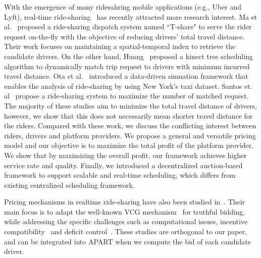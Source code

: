 With the emergence of many ridesahring mobile applications (e.g., Uber and Lyft), real-time ride-sharing~\cite{Ma13, Ma15, Huang14,Ota15, Cici15, Cao15, PelzerITS15} has recently attracted more research interest. Ma et al.~\cite{Ma13, Ma15} proposed a ride-sharing dispatch system named ``T-share" to serve the rider request on-the-fly with the objective of reducing drivers' total travel distance. Their work focuses on maintaining a spatial-temporal index to retrieve the candidate drivers. On the other hand, Huang~\cite{Huang14} proposed a kinect tree scheduling algorithm to dynamically match trip request to drivers with minimum incurred travel distance. Ota et al.~\cite{Ota15} introduced a data-driven simuation framework that enables the analysis of ride-sharing by using New York's taxi dataset. Santos et. al~\cite{SantosIjcai13} propose a ride-sharing system to maximize the number of matched request. The majority of these studies aim to minimize the total travel distance of drivers, however, we show that this does not necessarily mean shorter travel distance for the riders. Compared with these work, we discuss the conflicting interest between riders, drivers and platform providers. We propose a general and versatile pricing model and  our objective is to maximize the total profit of the platform provider. We show that by maximizing the overall profit, our framework achieves higher service rate and quality.  Finally, we introduced a decentralized auction-based framework to support scalable and real-time scheduling, which differs from existing centralized scheduling framework. 

Pricing mechanisms in realtime ride-sharing have also been studied in~\cite{KamarIJCAI09,KleinerIJCAI11, ZhaoAAMAS14}. Their main focus is to adapt the well-known VCG mechanism~\cite{Nisan07} for truthful bidding, while addressing the specific challenges such as computational issues, incentive compatibility~\cite{KamarIJCAI09, KleinerIJCAI11} and deficit control~\cite{ZhaoAAMAS14}. These studies are orthogonal to our paper, and can be integrated into APART when we compute the bid of each candidate driver. 

